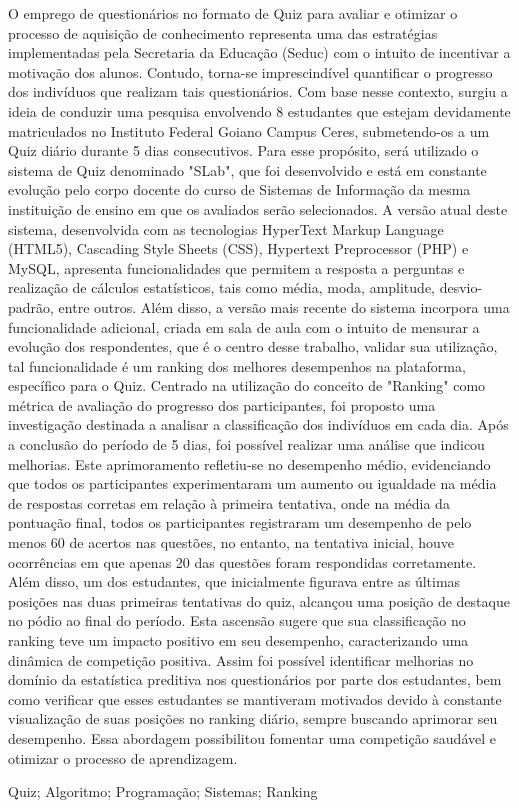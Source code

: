 \documentclass{modelo_resumo_simples}
\begin{document}
	
	\construirtitulo

	\construirautores
	
	\begin{resumo}
	O emprego de questionários no formato de Quiz para avaliar e otimizar o processo de aquisição de conhecimento representa uma das estratégias implementadas pela Secretaria da Educação (Seduc) com o intuito de incentivar a motivação dos alunos. Contudo, torna-se imprescindível quantificar o progresso dos indivíduos que realizam tais questionários. Com base nesse contexto, surgiu a ideia de conduzir uma pesquisa envolvendo 8 estudantes que estejam devidamente matriculados no Instituto Federal Goiano Campus Ceres, submetendo-os a um Quiz diário durante 5 dias consecutivos. Para esse propósito, será utilizado o sistema de Quiz denominado "SLab", que foi desenvolvido e está em constante evolução pelo corpo docente do curso de Sistemas de Informação da mesma instituição de ensino em que os avaliados serão selecionados. A versão atual deste sistema, desenvolvida com as tecnologias HyperText Markup Language (HTML5), Cascading Style Sheets (CSS), Hypertext Preprocessor (PHP) e MySQL, apresenta funcionalidades que permitem a resposta a perguntas e realização de cálculos estatísticos, tais como média, moda, amplitude, desvio-padrão, entre outros. Além disso, a versão mais recente do sistema incorpora uma funcionalidade adicional, criada em sala de aula com o intuito de mensurar a evolução dos respondentes, que é o centro desse trabalho, validar sua utilização, tal funcionalidade é um ranking dos melhores desempenhos na plataforma, específico para o Quiz. Centrado na utilização do conceito de "Ranking" como métrica de avaliação do progresso dos participantes, foi proposto uma investigação destinada a analisar a classificação dos indivíduos em cada dia. Após a conclusão do período de 5 dias, foi possível realizar uma análise que indicou melhorias. Este aprimoramento refletiu-se no desempenho médio, evidenciando que todos os participantes experimentaram um aumento ou igualdade na média de respostas corretas em relação à primeira tentativa, onde na média da pontuação final, todos os participantes registraram um desempenho de pelo menos 60 de acertos nas questões, no entanto, na tentativa inicial, houve ocorrências em que apenas 20 das questões foram respondidas corretamente. Além disso, um dos estudantes, que inicialmente figurava entre as últimas posições nas duas primeiras tentativas do quiz, alcançou uma posição de destaque no pódio ao final do período. Esta ascensão sugere que sua classificação no ranking teve um impacto positivo em seu desempenho, caracterizando uma dinâmica de competição positiva. Assim foi possível identificar melhorias no domínio da estatística preditiva nos questionários por parte dos estudantes, bem como verificar que esses estudantes se mantiveram motivados devido à constante visualização de suas posições no ranking diário, sempre buscando aprimorar seu desempenho. Essa abordagem possibilitou fomentar uma competição saudável e otimizar o processo de aprendizagem.
	\end{resumo}
	
	\begin{palavras_chave}
	Quiz; Algoritmo; Programação; Sistemas; Ranking
	\end{palavras_chave}
\end{document}
